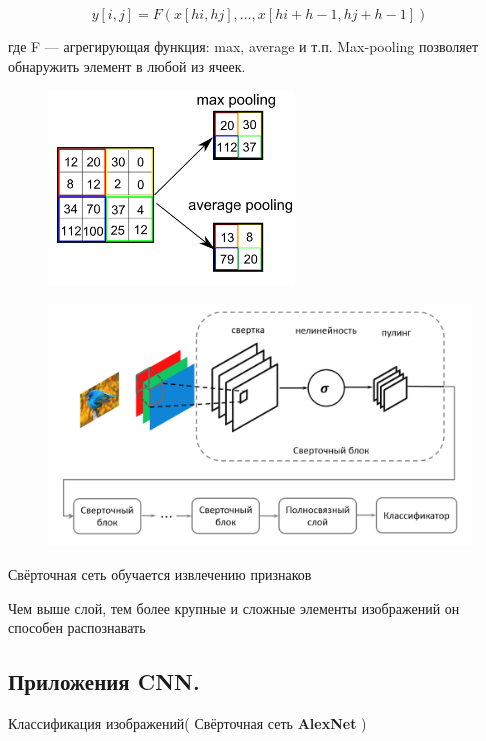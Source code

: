 \begin{description}
	      $$
		      y[i, j] = F \left( x[hi, hj], \ldots, x[hi + h - 1, hj + h - 1] \right)
	      $$

	      где  F  — агрегирующая функция: max, average и т.п. Max-pooling позволяет обнаружить элемент в любой из ячеек.

	      \begin{figure}[h]

		      \centering

		      \includegraphics[width=0.2\linewidth]{chapters/neural/images/пуллинг.png}

		      \label{fig:pulling}

	      \end{figure}

	      \begin{figure}[h]

		      \centering

		      \includegraphics[width=0.8\linewidth]{chapters/neural/images/1CNN.png}

		      \label{fig:one_cnn}

	      \end{figure}

	      Свёрточная сеть обучается извлечению признаков

	      Чем выше слой, тем более крупные и сложные элементы изображений он способен распознавать

	      \newpage
	      \subsection{Приложения CNN.}

	      Классификация изображений( Свёрточная сеть \textbf{AlexNet} )\\


\end{description}
